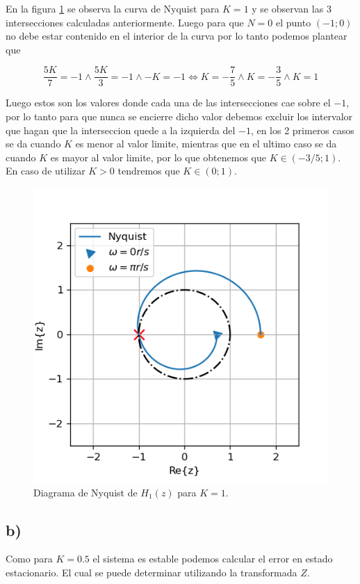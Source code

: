 \documentclass{article}
\begin{document}
            En la figura \ref{fig:11-nyquist} se observa la curva de Nyquist para $K=1$ y se observan las 3 intersecciones calculadas anteriormente.
            Luego para que $N=0$ el punto $(-1;0)$ no debe estar contenido en el interior de la curva por lo tanto podemos plantear que 

            \begin{equation}
                \frac{5K}{7} = -1 \land \frac{5K}{3} = -1 \land -K = -1 \Leftrightarrow
                K = -\frac{7}{5} \land K = -\frac{3}{5} \land K = 1
            \end{equation}

            Luego estos son los valores donde cada una de las intersecciones cae sobre el $-1$, por lo tanto para que nunca se encierre dicho 
            valor debemos excluir los intervalor que hagan que la interseccion quede a la izquierda del $-1$, en los 2 primeros casos se da cuando 
            $K$ es menor al valor limite, mientras que en el ultimo caso se da cuando $K$ es mayor al valor limite, por lo que obtenemos que $K \in (-3/5;1)$.
            En caso de utilizar $K>0$ tendremos que $K \in (0;1)$.

            \begin{figure}[!htb]
               \centering
               \includegraphics[width=.5\textwidth]{Img/11-nyquist.png}
               \caption{Diagrama de Nyquist de $H_1(z)$ para $K=1$.}
               \label{fig:11-nyquist}
            \end{figure}

        \subsection{b)}

            Como para $K=0.5$ el sistema es estable podemos calcular el error en estado estacionario. El cual se puede determinar utilizando la transformada $Z$.
\end{document}
